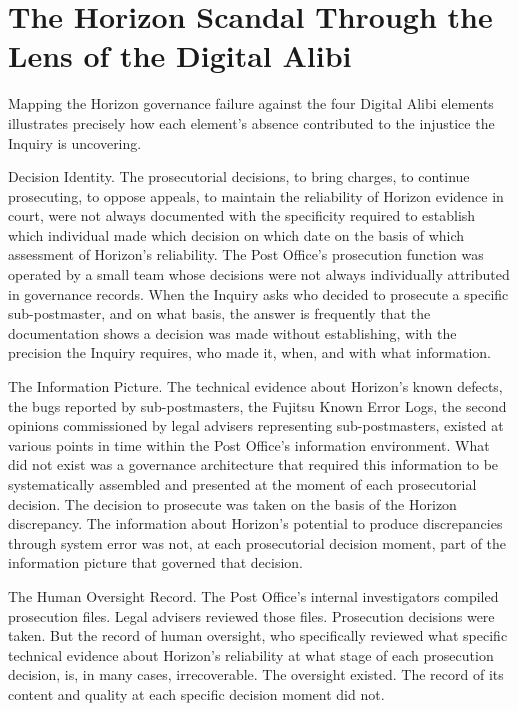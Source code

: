 \scenebreak

\section{The Horizon Scandal Through the Lens of the Digital Alibi}

Mapping the Horizon governance failure against the four Digital Alibi elements illustrates precisely how each element's absence contributed to the injustice the Inquiry is uncovering.

Decision Identity. The prosecutorial decisions, to bring charges, to continue prosecuting, to oppose appeals, to maintain the reliability of Horizon evidence in court, were not always documented with the specificity required to establish which individual made which decision on which date on the basis of which assessment of Horizon's reliability. The Post Office's prosecution function was operated by a small team whose decisions were not always individually attributed in governance records. When the Inquiry asks who decided to prosecute a specific sub-postmaster, and on what basis, the answer is frequently that the documentation shows a decision was made without establishing, with the precision the Inquiry requires, who made it, when, and with what information.

The Information Picture. The technical evidence about Horizon's known defects, the bugs reported by sub-postmasters, the Fujitsu Known Error Logs, the second opinions commissioned by legal advisers representing sub-postmasters, existed at various points in time within the Post Office's information environment. What did not exist was a governance architecture that required this information to be systematically assembled and presented at the moment of each prosecutorial decision. The decision to prosecute was taken on the basis of the Horizon discrepancy. The information about Horizon's potential to produce discrepancies through system error was not, at each prosecutorial decision moment, part of the information picture that governed that decision.

The Human Oversight Record. The Post Office's internal investigators compiled prosecution files. Legal advisers reviewed those files. Prosecution decisions were taken. But the record of human oversight, who specifically reviewed what specific technical evidence about Horizon's reliability at what stage of each prosecution decision, is, in many cases, irrecoverable. The oversight existed. The record of its content and quality at each specific decision moment did not.

